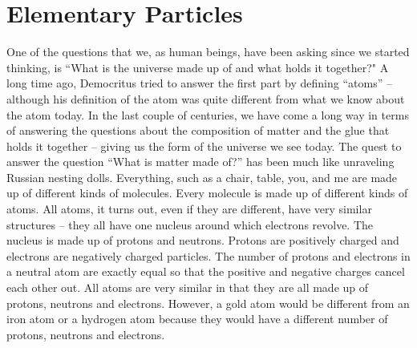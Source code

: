 
\section{Elementary Particles}
One of the questions that we, as human beings, have been asking since we started thinking, is “What is the universe made up of and what holds it together?" A long time ago, Democritus tried to answer the first part by defining “atoms” – although his definition of the atom was quite different from what we know about the atom today. In the last couple of centuries, we have come a long way in terms of answering the questions about the composition of matter and the glue that holds it together – giving us the form of the universe we see today.
The quest to answer the question “What is matter made of?” has been much like unraveling Russian nesting dolls. Everything, such as a chair, table, you, and me are made up of different kinds of molecules. Every molecule is made up of different kinds of atoms. All atoms, it turns out, even if they are different, have very similar structures – they all have one nucleus around which electrons revolve. The nucleus is made up of protons and neutrons. Protons are positively charged and electrons are negatively charged particles. The number of protons and electrons in a neutral atom are exactly equal so that the positive and negative charges cancel each other out.  All atoms are very similar in that they are all made up of protons, neutrons and electrons. However, a gold atom would be different from an iron atom or a hydrogen atom because they would have a different number of protons, neutrons and electrons.  




